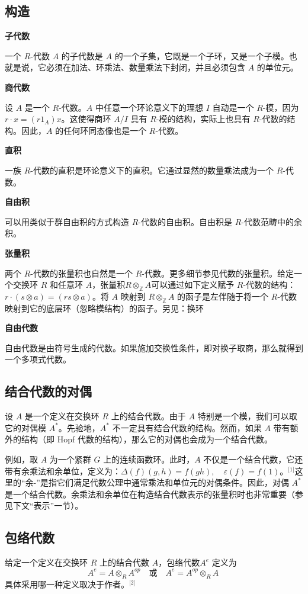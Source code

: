 \subsection{构造}
\textbf{子代数}

一个 $R$-代数 $A$ 的子代数是 $A$ 的一个子集，它既是一个子环，又是一个子模。也就是说，它必须在加法、环乘法、数量乘法下封闭，并且必须包含 $A$ 的单位元。

\textbf{商代数}

设 $A$ 是一个 $R$-代数。$A$ 中任意一个环论意义下的理想 $I$ 自动是一个 $R$-模，因为$r \cdot x = (r 1_A) x$。这使得商环 $A / I$ 具有 $R$-模的结构，实际上也具有 $R$-代数的结构。因此，$A$ 的任何环同态像也是一个 $R$-代数。

\textbf{直积}

一族 $R$-代数的直积是环论意义下的直积。它通过显然的数量乘法成为一个 $R$-代数。

\textbf{自由积}

可以用类似于群自由积的方式构造 $R$-代数的自由积。自由积是 $R$-代数范畴中的余积。

\textbf{张量积}

两个 $R$-代数的张量积也自然是一个 $R$-代数。更多细节参见代数的张量积。给定一个交换环 $R$ 和任意环 $A$，张量积$R \otimes_{\mathbb{Z}} A$可以通过如下定义赋予 $R$-代数的结构：$r \cdot (s \otimes a) = (rs \otimes a)$。将 $A$ 映射到 $R \otimes_{\mathbb{Z}} A$ 的函子是左伴随于将一个 $R$-代数映射到它的底层环（忽略模结构）的函子。另见：换环

\textbf{自由代数}

自由代数是由符号生成的代数。如果施加交换性条件，即对换子取商，那么就得到一个多项式代数。
\subsection{结合代数的对偶}
设 $A$ 是一个定义在交换环 $R$ 上的结合代数。由于 $A$ 特别是一个模，我们可以取它的对偶模 $A^*$。先验地，$A^*$ 不一定具有结合代数的结构。然而，如果 $A$ 带有额外的结构（即 Hopf 代数的结构），那么它的对偶也会成为一个结合代数。

例如，取 $A$ 为一个紧群 $G$ 上的连续函数环。此时，$A$ 不仅是一个结合代数，它还带有余乘法和余单位，定义为：$\Delta(f)(g, h) = f(gh), \quad \varepsilon(f) = f(1)$。\(^\text{[1]}\)这里的“余-”是指它们满足代数公理中通常乘法和单位元的对偶条件。因此，对偶 $A^*$ 是一个结合代数。余乘法和余单位在构造结合代数表示的张量积时也非常重要（参见下文“表示”一节）。
\subsection{包络代数}
给定一个定义在交换环 $R$ 上的结合代数 $A$，包络代数$A^e$ 定义为
$$
A^e = A \otimes_R A^{op}
\quad \text{或} \quad
A^e = A^{op} \otimes_R A~
$$
具体采用哪一种定义取决于作者。\(^\text{[2]}\)

